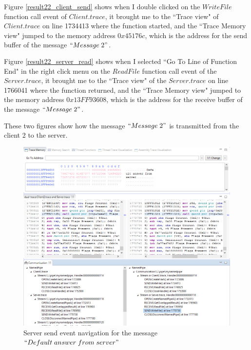 Figure \ref{result22_client_send} shows when I double clicked on the $WriteFile$ function call event of $Client.trace$, it brought me to the ``Trace view" of $Client.trace$ on line 1734413 where the function started, and the ``Trace Memory view" jumped to the memory address $0x45176c$, which is the address for the send buffer of the message $``Message\; 2"$.

Figure \ref{result22_server_read} shows when I selected ``Go To Line of Function End" in the right click menu on the $ReadFile$ function call event of the $Server.trace$, it brought me to the ``Trace view" of the $Server.trace$ on line 1766041 where the function returned, and the ``Trace Memory view" jumped to the memory address $0x13FF93608$, which is the address for the receive buffer of the message $``Message\; 2"$.

These two figures show how the message $``Message\; 2"$ is transmitted from the client 2 to the server.



\begin{figure}
\includegraphics[width=\textwidth]{Figures/result22_server_send}
 \caption{Server send event navigation for the message $``Default\; answer\; from\; server"$}
\label{result22_server_send}
\end{figure}


